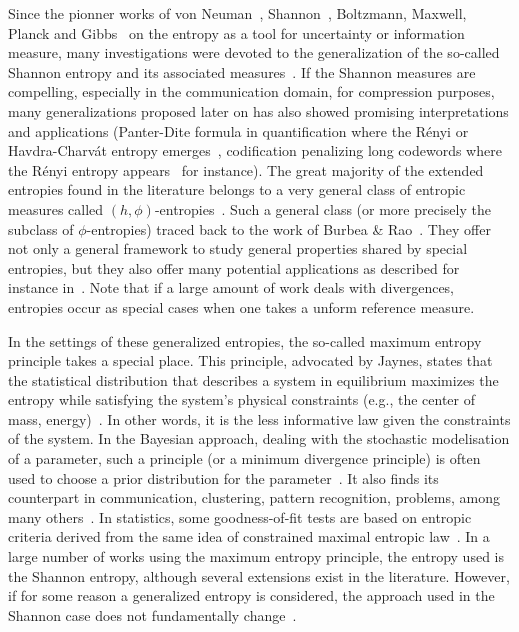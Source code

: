 \documentclass[english,sort&compress]{elsarticle}
\theoremstyle{definition}
\theoremstyle{plain}
\theoremstyle{plain}
\begin{document}
Since  the  pionner  works of  von  Neuman~\cite{vNeu27},  Shannon~\cite{Sha48},
Boltzmann,  Maxwell,  Planck  and  Gibbs~\cite{Bol64,  Pla15,  Nie52:v2,  Jay65,
  MulMul09} on  the entropy as  a tool  for uncertainty or  information measure,
many investigations were devoted to  the generalization of the so-called Shannon
entropy and its associated  measures~\cite{Ren61, Var66, HavCha67, Csi67, Dar70,
  AczDar75, DarJar79, Tsa88,  Sal87, SalMen93, Sal94, LieVaj06,  Bas13}.  If the
Shannon measures  are compelling,  especially in  the communication  domain, for
compression purposes,  many generalizations  proposed later  on has  also showed
promising   interpretations    and   applications   (Panter-Dite    formula   in
quantification    where     the    R\'enyi    or     Havdra-Charv\'at    entropy
emerges~\cite{PanDit51, Llo82, GerGra92}, codification penalizing long codewords
where the R\'enyi entropy appears~\cite{Cam65,  Ber09} for instance).  The great
majority of  the extended entropies  found in the  literature belongs to  a very
general  class  of  entropic measures  called  $(h,\phi)$-entropies~\cite{Csi67,
  BurRao82, SalMen93,  Sal94, MenMor97, Par06}.   Such a general class  (or more
precisely the subclass of $\phi$-entropies) traced back to the work of Burbea \&
Rao~\cite{BurRao82}. They  offer not only  a general framework to  study general
properties  shared by  special entropies,  but  they also  offer many  potential
applications as  described for instance  in~\cite{Par06}.  Note that if  a large
amount of work deals with divergences, entropies occur as special cases when one
takes a unform reference measure.

 In the settings  of these generalized entropies, the  so-called maximum entropy
 principle takes a  special place.  This principle, advocated  by Jaynes, states
 that  the  statistical distribution  that  describes  a system  in  equilibrium
 maximizes the entropy while satisfying the system's physical constraints (e.g.,
 the  center of  mass, energy)~\cite{Jay57,  Kap89, Arn01,  CovTho06}. In  other
 words, it is the  less informative law given the constraints  of the system. In
 the Bayesian approach, dealing with the stochastic modelisation of a parameter,
 such a principle (or a minimum divergence  principle) is often used to choose a
 prior  distribution  for  the parameter~\cite{Jay68,  Csi91,  Bas13,  FriSri08,
   Rob07}. It also  finds its counterpart in  communication, clustering, pattern
 recognition, problems, among many others~\cite{Kap89, JonByr90, Arn01, HerMa02,
   ParBer09}. In  statistics, some goodness-of-fit  tests are based  on entropic
 criteria  derived   from  the  same   idea  of  constrained   maximal  entropic
 law~\cite{Vas76, Gok83,  Son02, Leq14, Leq15,  GirReg15}. In a large  number of
 works using  the maximum  entropy principle,  the entropy  used is  the Shannon
 entropy, although several extensions exist  in the literature.  However, if for
 some  reason a  generalized entropy  is considered,  the approach  used in  the
 Shannon  case   does  not  fundamentally   change~\cite{KesKap89,  BorLew91:03,
   BorLew91:05, BorLew93}.
\end{document}
